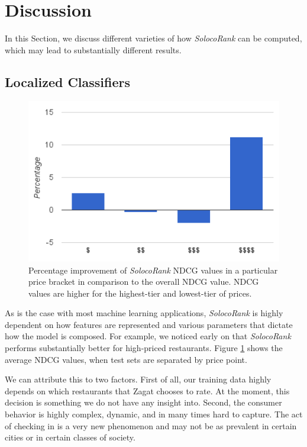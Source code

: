 \section{Discussion}
\label{sec:discussion}
In this Section, we discuss different varieties of how
\emph{SolocoRank} can be computed, which may lead to substantially different results.

\subsection{Localized Classifiers}

\begin{figure}[h]
  \includegraphics[width=.5\textwidth]{fig/ndcg-vs-price.png}
  \caption{Percentage improvement of \emph{SolocoRank} NDCG values in a particular
  price bracket in comparison to the overall NDCG value. NDCG values are
  higher for the highest-tier and lowest-tier of prices.}
  \label{fig:ndcg-vs-price}
\end{figure}

As is the case with most machine learning applications,
\emph{SolocoRank} is highly dependent on how features are represented
and various parameters that dictate how the model is composed.
For example, we noticed early on that \emph{SolocoRank} performs
substantially better for high-priced restaurants.
Figure \ref{fig:ndcg-vs-price} shows the average NDCG values,
when test sets are separated by price point.

We can attribute this to two factors. 
First of all, our training data highly depends on which restaurants
that Zagat chooses to rate.
At the moment, this decision is something we do not have any insight into.
Second, the consumer behavior is highly complex, dynamic, and in many times hard to capture.
The act of checking in is a very new phenomenon and may not be as
prevalent in certain cities or in certain classes of society.

